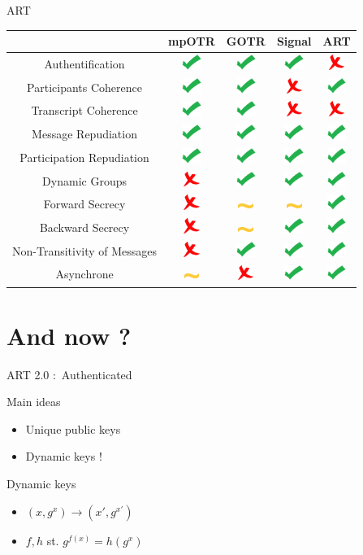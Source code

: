 \documentclass{beamer}
\newcommand{\okay}{\includegraphics[height=0.5cm]{img/check.png}}
\newcommand{\nope}{\includegraphics[height=0.5cm]{img/cross.png}}
\newcommand{\sortof}{\includegraphics[width=0.5cm]{img/tilde.png}}
\newcommand{\ra}{\rightarrow}
\begin{document}
\begin{frame}{ART}
	\center
  	\begin{tabular}{c|cccc}
			 & mpOTR & GOTR & Signal & ART\\
			\hline
  		Authentification & \okay & \okay & \okay & \nope \\
  		\hline
  		Participants Coherence & \okay & \okay & \nope & \okay \\
  		Transcript Coherence & \okay & \okay & \nope & \nope \\
  		\hline
  		Message Repudiation & \okay & \okay & \okay & \okay \\
  		Participation Repudiation & \okay & \okay & \okay & \okay \\
  		\hline
  		Dynamic Groups & \nope & \okay & \okay & \okay\\
  		\hline
  		Forward Secrecy & \nope & \sortof & \sortof & \okay \\
  		Backward Secrecy & \nope & \sortof & \okay & \okay\\
  		Non-Transitivity of Messages & \nope & \okay & \okay & \okay \\
  		\hline
  		Asynchrone & \sortof & \nope & \okay & \okay 
    \end{tabular}
\end{frame}

\section{And now ?}
\begin{frame}{ART 2.0 : Authenticated}
	\begin{block}{Main ideas}
		\begin{itemize}
			\item Unique public keys
			\item Dynamic keys ! 
		\end{itemize}		
	\end{block}
	\pause
	\begin{block}{Dynamic keys}
		\begin{itemize}
			\item $(x, g^x) \ra (x', g^{x'})$
			\item $f, h$ st. $g^{f(x)} = h(g^x)$
		\end{itemize}
	\end{block}
\end{frame}
\end{document}
